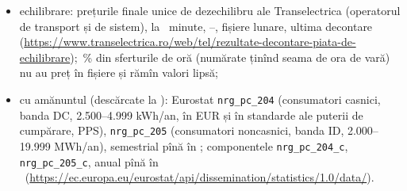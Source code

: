 {\begin{itemize}
\begin{itemize}
  \item {}%
  {echilibrare: prețurile finale unice de dezechilibru ale Transelectrica (operatorul de transport și de sistem), la \NmtuMin\ minute, \NimbStart--\NimbEnd, fișiere lunare, ultima decontare (\url{https://www.transelectrica.ro/web/tel/rezultate-decontare-piata-de-echilibrare}); \NblankImb\,\% din sferturile de oră (numărate ținînd seama de ora de vară) nu au preț în fișiere și rămîn valori lipsă;}
  \item {}%
  {cu amănuntul (descărcate la \NesDl): Eurostat \texttt{nrg\_pc\_204} (consumatori casnici, banda DC, 2.500--4.999 kWh/an, în EUR și în standarde ale puterii de cumpărare, PPS), \texttt{nrg\_pc\_205} (consumatori noncasnici, banda ID, 2.000--19.999 MWh/an), semestrial pînă în \NlastSem; componentele \texttt{nrg\_pc\_204\_c}, \texttt{nrg\_pc\_205\_c}, anual pînă în \NlastYear\ (\url{https://ec.europa.eu/eurostat/api/dissemination/statistics/1.0/data/}).}
  \end{itemize}
\end{itemize}}

